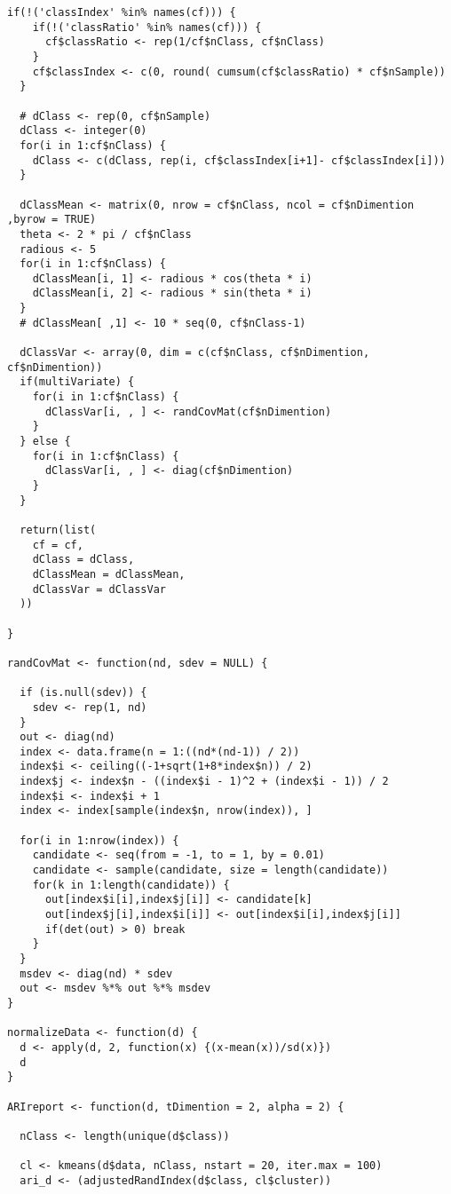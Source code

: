 \begin{latin}
\begin{Verbatim}[breaklines=true, breakanywhere=true, baselinestretch=1]
  if(!('classIndex' %in% names(cf))) {
    if(!('classRatio' %in% names(cf))) {
      cf$classRatio <- rep(1/cf$nClass, cf$nClass)
    }
    cf$classIndex <- c(0, round( cumsum(cf$classRatio) * cf$nSample))
  }
  
  # dClass <- rep(0, cf$nSample)
  dClass <- integer(0)
  for(i in 1:cf$nClass) {
    dClass <- c(dClass, rep(i, cf$classIndex[i+1]- cf$classIndex[i]))
  }
  
  dClassMean <- matrix(0, nrow = cf$nClass, ncol = cf$nDimention  ,byrow = TRUE)
  theta <- 2 * pi / cf$nClass
  radious <- 5
  for(i in 1:cf$nClass) {
    dClassMean[i, 1] <- radious * cos(theta * i)
    dClassMean[i, 2] <- radious * sin(theta * i)
  }
  # dClassMean[ ,1] <- 10 * seq(0, cf$nClass-1)
  
  dClassVar <- array(0, dim = c(cf$nClass, cf$nDimention, cf$nDimention))
  if(multiVariate) {
    for(i in 1:cf$nClass) {
      dClassVar[i, , ] <- randCovMat(cf$nDimention)
    }
  } else {
    for(i in 1:cf$nClass) {
      dClassVar[i, , ] <- diag(cf$nDimention)
    }
  }
  
  return(list(
    cf = cf,
    dClass = dClass,
    dClassMean = dClassMean,
    dClassVar = dClassVar
  ))
  
}

randCovMat <- function(nd, sdev = NULL) {

  if (is.null(sdev)) {
    sdev <- rep(1, nd)
  }
  out <- diag(nd)
  index <- data.frame(n = 1:((nd*(nd-1)) / 2))
  index$i <- ceiling((-1+sqrt(1+8*index$n)) / 2)
  index$j <- index$n - ((index$i - 1)^2 + (index$i - 1)) / 2
  index$i <- index$i + 1
  index <- index[sample(index$n, nrow(index)), ]
  
  for(i in 1:nrow(index)) {
    candidate <- seq(from = -1, to = 1, by = 0.01)
    candidate <- sample(candidate, size = length(candidate))
    for(k in 1:length(candidate)) {
      out[index$i[i],index$j[i]] <- candidate[k]
      out[index$j[i],index$i[i]] <- out[index$i[i],index$j[i]]
      if(det(out) > 0) break
    } 
  }
  msdev <- diag(nd) * sdev
  out <- msdev %*% out %*% msdev
}

normalizeData <- function(d) {
  d <- apply(d, 2, function(x) {(x-mean(x))/sd(x)})
  d
}

ARIreport <- function(d, tDimention = 2, alpha = 2) {
  
  nClass <- length(unique(d$class))
  
  cl <- kmeans(d$data, nClass, nstart = 20, iter.max = 100)
  ari_d <- (adjustedRandIndex(d$class, cl$cluster))
  

\end{Verbatim}
\end{latin}
